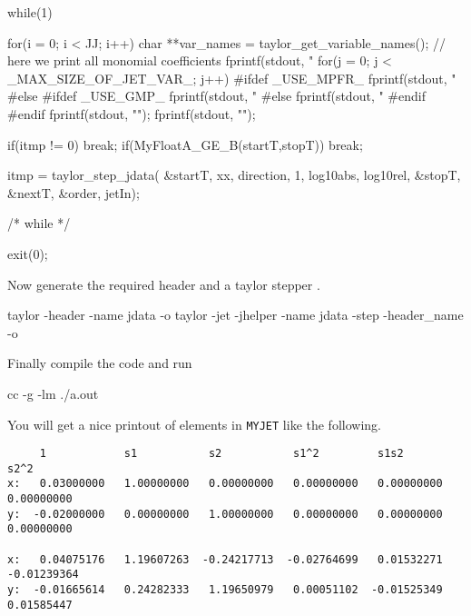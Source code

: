 \documentclass[10pt]{article}
\theoremstyle{remark}
\newcommand{\myjet}{{\tt MY\symbol{95}JET}}
\newcommand{\inputfile}{}
\newcommand{\mainfile}{}
\newcommand{\odecfile}{}
\newcommand{\odehfile}{}
\begin{document}
\begin{code}[title={File: \mainfile{}}]
{    	 while(1)  {
    	   for(i = 0; i < JJ; i++) {
    	     char **var_names = taylor_get_variable_names();
    	     // here we print all monomial coefficients	   	     
    	     fprintf(stdout, "%
    	     for(j = 0; j < _MAX_SIZE_OF_JET_VAR_; j++) {
    #ifdef _USE_MPFR_	 	       
    	       fprintf(stdout, "%
    #else
    #ifdef _USE_GMP_
    	       fprintf(stdout, "%
    #else
    	       fprintf(stdout, "%
    #endif
    #endif	       
    	     }
    	     fprintf(stdout, "\n");	     
    	   }
    	   fprintf(stdout, "\n");	     	   
    	   
    	   if(itmp != 0) {break;} 
    	   if(MyFloatA_GE_B(startT,stopT)) { break;}
    	   
    	   itmp = taylor_step_jdata( &startT, xx, direction, 1, 
    	                             log10abs, log10rel, 
    	                             &stopT, &nextT, &order, jetIn);
    
    	 }  /* while */
    	 
    	 exit(0); 
     }   
\end{code}
Now generate the required header \odehfile{} and a taylor stepper \odecfile{}.
\begin{command}
   taylor -header -name jdata -o \odehfile{} \inputfile{} 
   taylor -jet -jhelper -name jdata -step -header_name \odehfile{} \inputfile{} -o \odecfile{}
\end{command}
Finally compile the code and run
\begin{command}
    cc -g \odecfile{} \mainfile{} -lm
    ./a.out
\end{command}
You will get a nice printout of elements in \myjet{} like the following.
\begin{verbatim}
     1            s1           s2           s1^2         s1s2         s2^2         
x:   0.03000000   1.00000000   0.00000000   0.00000000   0.00000000   0.00000000 
y:  -0.02000000   0.00000000   1.00000000   0.00000000   0.00000000   0.00000000 

x:   0.04075176   1.19607263  -0.24217713  -0.02764699   0.01532271  -0.01239364 
y:  -0.01665614   0.24282333   1.19650979   0.00051102  -0.01525349   0.01585447 
\end{verbatim}
\end{document}
